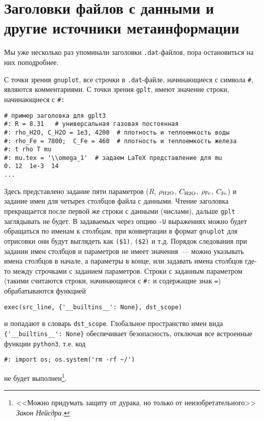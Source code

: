 \documentclass[12pt]{article}
\def\gplt{{\tt gplt}}
\def\gnuplot{{\tt gnuplot}}
\def\python{{\tt python3}}
\begin{document}
\section{Заголовки файлов с данными и другие источники метаинформации}\label{metainfo:sec}
\begin{wrapfigure}[5]{t}{.3\textwidth}
  \vphantom{.}
  \vspace{-1.2cm}

\end{wrapfigure}
Мы уже несколько раз упоминали заголовки \verb'.dat'-файлов, пора остановиться на них поподробнее.

С точки зрения \gnuplot, все строчки в \verb'.dat'-файле, начинающиеся с символа \verb'#', являются комментариями. С точки зрения \gplt{},
имеют значение строки, начинающиеся с \verb'#:'
\begin{verbatim}
# пример заголовка для gplt3
#: R = 8.31   # универсальная газовая постоянная
#: rho_H2O, C_H2O = 1e3, 4200  # плотность и теплоемкость воды
#: rho_Fe = 7800;  C_Fe = 460  # плотность и теплоемкость железа
#: t rho T mu
#: mu.tex = '\\omega_1'  # задаем LaTeX представление для mu
0. 12  1e-3  14
...
\end{verbatim}
Здесь представлено задание пяти параметров ($R$, $\rho_{\rm H2O}$, $C_{\rm H2O}$, $\rho_{\rm Fe}$, $C_{\rm Fe}$) и задание имен для четырех столбцов файла с данными.
Чтение заголовка прекращается после первой же строки с данными (числами), дальше \gplt{} заглядывать не будет. В задаваемых через опцию \verb'-U'
выражениях можно будет обращаться по именам к столбцам, при конвертации в формат \gnuplot{} для отрисовки они будут выглядеть как \verb'($1)', \verb'($2)' и т.д.
Порядок следования при задании имен столбцов и параметров не имеет значения~--- можно указывать имена столбцов в начале, а параметры в конце, или задавать имена столбцов
где-то между строчками с заданием параметров. Строки с заданным параметром (такими считаются строки, начинающиеся с \verb'#:' и содержащие знак \verb'=')
обрабатываются функцией
\begin{verbatim}
exec(src_line, {'__builtins__': None}, dst_scope)
\end{verbatim}
и попадают в словарь \verb'dst_scope'. Глобальное пространство имен вида \verb|{'__builtins__': None}| обеспечивает безопасность, отключая все
встроенные функции \python{}, т.е. код
\begin{verbatim}
#: import os; os.system('rm -rf ~/')
\end{verbatim}
не будет выполнен\footnote{<<Можно придумать защиту от дурака, но только от неизобретательного>> {\it Закон Нейсдра.}}. 
\end{document}
